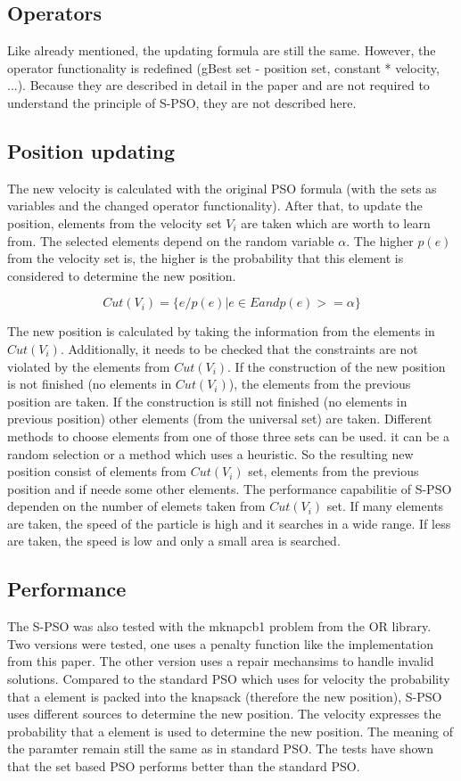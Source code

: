 \documentclass{article}
\begin{document}
\subsection{Operators}
Like already mentioned, the updating formula are still the same. However, the operator functionality is redefined (gBest set - position set, constant * velocity, ...). Because they are described in detail in the paper and are not required to understand the principle of S-PSO, they are not described here.

\subsection{Position updating}
The new velocity is calculated with the original PSO formula (with the sets as variables and the changed operator functionality). After that, to update the position, elements from the velocity set $V_i$ are taken which are worth to learn from. The selected elements depend on the random variable $\alpha$. The higher $p(e)$ from the velocity set is, the higher is the probability that this element is considered to determine the new position.

\begin{equation}
Cut(V_i) = \{e/p(e)| e \in E and p(e) >= \alpha\}
\end{equation}

The new position is calculated by taking the information from the elements in $Cut(V_i)$. Additionally, it needs to be checked that the constraints are not violated by the elements from $Cut(V_i)$. If the construction of the new position is not finished (no elements in $Cut(V_i)$), the elements from the previous position are taken. If the construction is still not finished (no elements in previous position) other elements (from the universal set) are taken. Different methods to choose elements from one of those three sets can be used. it can be a random selection or a method which uses a heuristic. So the resulting new position consist of elements from $Cut(V_i)$ set, elements from the previous position and if neede some other elements. The performance capabilitie of S-PSO dependen on the number of elemets taken from $Cut(V_i)$ set. If many elements are taken, the speed of the particle is high and it searches in a wide range. If less are taken, the speed is low and only a small area is searched.

\subsection{Performance}
The S-PSO was also tested with the mknapcb1 problem from the OR library. Two versions were tested, one uses a penalty function like the implementation from this paper. The other version uses a repair mechansims to handle invalid solutions. Compared to the standard PSO which uses for velocity the probability that a element is packed into the knapsack (therefore the new position), S-PSO uses different sources to determine the new position. The velocity expresses the probability that a element is used to determine the new position. The meaning of the paramter remain still the same as in standard PSO. The tests have shown that the set based PSO performs better than the standard PSO.
\end{document}
